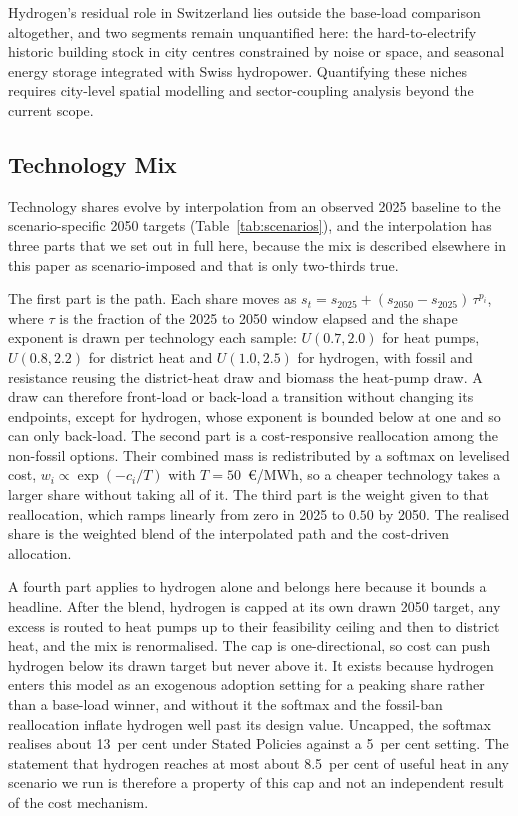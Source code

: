 Hydrogen's residual role in Switzerland lies outside the base-load comparison
altogether, and two segments remain unquantified here: the hard-to-electrify historic
building stock in city centres constrained by noise or space, and seasonal energy
storage integrated with Swiss hydropower. Quantifying these niches requires
city-level spatial modelling and sector-coupling analysis beyond the current scope.


\subsection{Technology Mix}
\label{sec:method:techshares}

Technology shares evolve by interpolation from an observed 2025 baseline to the
scenario-specific 2050 targets (Table~\ref{tab:scenarios}), and the interpolation has
three parts that we set out in full here, because the mix is described elsewhere in this
paper as scenario-imposed and that is only two-thirds true.

The first part is the path. Each share moves as
$s_{t} = s_{2025} + (s_{2050}-s_{2025})\,\tau^{p_{i}}$, where $\tau$ is the fraction of
the 2025 to 2050 window elapsed and the shape exponent is drawn per technology each
sample: $U(0.7,2.0)$ for heat pumps, $U(0.8,2.2)$ for district heat and $U(1.0,2.5)$ for
hydrogen, with fossil and resistance reusing the district-heat draw and biomass the
heat-pump draw. A draw can therefore front-load or back-load a transition without changing
its endpoints, except for hydrogen, whose exponent is bounded below at one and so can only
back-load. The second part is a cost-responsive reallocation among the non-fossil
options. Their combined mass is redistributed by a softmax on levelised cost,
$w_{i} \propto \exp(-c_{i}/T)$ with $T = 50$~\euro{}/MWh, so a cheaper technology takes a
larger share without taking all of it. The third part is the weight given to that
reallocation, which ramps linearly from zero in 2025 to $0.50$ by 2050. The realised
share is the weighted blend of the interpolated path and the cost-driven allocation.

A fourth part applies to hydrogen alone and belongs here because it bounds a headline.
After the blend, hydrogen is capped at its own drawn 2050 target, any excess is routed to
heat pumps up to their feasibility ceiling and then to district heat, and the mix is
renormalised. The cap is one-directional, so cost can push hydrogen below its drawn target
but never above it. It exists because hydrogen enters this model as an exogenous adoption setting for a
peaking share rather than a base-load winner, and without it the softmax and the fossil-ban
reallocation inflate hydrogen well past its design value. Uncapped, the softmax realises about
13~per cent under Stated Policies against a 5~per cent setting. The statement that hydrogen
reaches at most about 8.5~per cent of useful heat in any scenario we run is therefore a
property of this cap and not an independent result of the cost mechanism.

